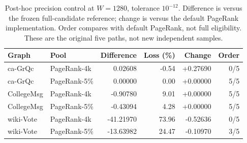 \begin{table}[htbp]
\caption{Post-hoc precision control at $W=1280$, tolerance $10^{-12}$. Difference is versus the frozen full-candidate reference; change is versus the default PageRank implementation. Order compares with default PageRank, not full eligibility. These are the original five paths, not new independent samples.}\label{tab:precision}
\begin{tabular}{llrrrr}
\toprule
Graph & Pool & Difference & Loss (\%) & Change & Order \\
\midrule
ca-GrQc & PageRank-4k & 0.02608 & -0.54 & +0.27690 & 0/5 \\
ca-GrQc & PageRank-5\% & 0.00000 & 0.00 & +0.00000 & 5/5 \\
CollegeMsg & PageRank-4k & -0.90780 & 9.01 & +0.00000 & 5/5 \\
CollegeMsg & PageRank-5\% & -0.43094 & 4.28 & +0.00000 & 5/5 \\
wiki-Vote & PageRank-4k & -41.21970 & 73.96 & -0.52636 & 0/5 \\
wiki-Vote & PageRank-5\% & -13.63982 & 24.47 & -0.10970 & 3/5 \\
\bottomrule
\end{tabular}
\end{table}
